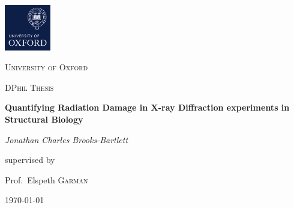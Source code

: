 \begin{titlepage}
	\centering
	\includegraphics[width=0.15\textwidth]{figures/titlepage/ox_brand_cmyk_pos.pdf}\par\vspace{1cm}
	{\scshape\LARGE University of Oxford \par}
	\vspace{1cm}
	{\scshape\Large DPhil Thesis\par}
	\vspace{1.5cm}
	{\huge\bfseries Quantifying Radiation Damage in X-ray Diffraction experiments in Structural Biology \par}
	\vspace{2cm}
	{\Large\itshape Jonathan Charles Brooks-Bartlett\par}
	\vfill
	supervised by\par
	Prof.~Elspeth \textsc{Garman}

	\vfill

	{\large \today\par}
\end{titlepage}
